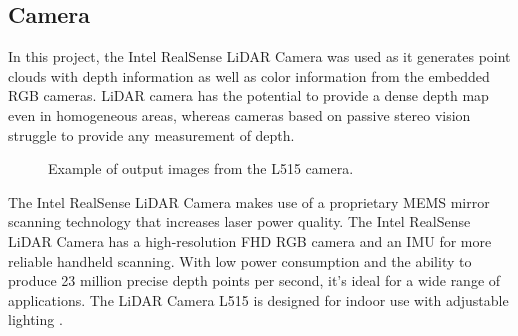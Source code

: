\subsection{Camera\label{subsec:camera}} 
In this project, the Intel RealSense LiDAR Camera was used as it generates point clouds with depth information as well as color information from the embedded RGB cameras. LiDAR camera has the potential to provide a dense depth map even in homogeneous areas, whereas cameras based on passive stereo vision struggle to provide any measurement of depth. 
\begin{figure}[h]
 \centering
 \hfill
 \hfill
 \caption{Example of output images from the L515 camera.}
 \label{figure: lidar}
\end{figure}


The Intel RealSense LiDAR Camera makes use of a proprietary MEMS mirror scanning technology that increases laser power quality. The Intel RealSense LiDAR Camera has a high-resolution FHD RGB camera and an IMU for more reliable handheld scanning. With low power consumption and the ability to produce 23 million precise depth points per second, it's ideal for a wide range of applications. The LiDAR Camera L515 is designed for indoor use with adjustable lighting \cite{noauthor_intel_nodate}.


